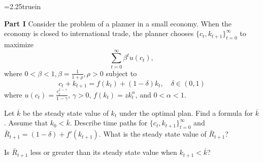 \centerline{\epsfxsize=2.25truein}
\caption{Marginal product of capital as function of time in two economies with different values of $\gamma$.}
\endfigure
\medskip

\medskip
{}  \medskip
\medskip
\noindent
{\bf Part  I}
\medskip \noindent
Consider the problem of a planner in a small economy. When the economy is closed to international trade, the planner chooses $\{c_t,k_{t+1}\}_{t=0}^\infty$ to maximize
$$ \sum_{t=0}^\infty \beta^t u(c_t), $$
where $ 0< \beta<1, \beta = {\frac{1}{1+\rho}}, \rho>0$
subject to
$$c_t+k_{t+1}=f(k_t)+(1-\delta)k_t,  \quad  \delta \in (0,1)$$
\noindent where $u(c_t)={\frac{c_t^{1-\gamma}}{1-\gamma}}$, $\gamma>0$, $f(k_t)=zk_t^\alpha$, and $0<\alpha<1$.


\medskip
\noindent
Let $\overline{k}$ be the steady state value of $k_t$ under the optimal plan.
\medskip
{} Find a formula for $\overline{k}$.
\medskip
{} Assume that $k_0<\overline{k}$. Describe time paths for $\{c_t,k_{t+1}\}_{t=0}^\infty$ and $\bar R_{t+1}=(1-\delta) + f'(k_{t+1})$.
\medskip
{} What is the steady state value of $\bar R_{t+1}$?\medskip

 Is $\bar R_{t+1}$ less or greater than its steady state value when $k_{t+1} < \overline{k}$?

